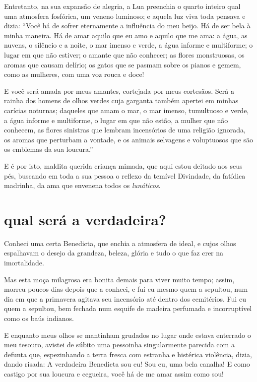 Entretanto, na sua expansão de alegria, a Lua preenchia o quarto inteiro 
qual uma atmosfera fosfórica, um veneno luminoso; e aquela 
luz viva toda pensava e dizia: “Você há de sofrer eternamente
a influência do meu beijo. Há de ser bela à minha maneira. Há de amar
aquilo que eu amo e aquilo que me ama: a água, as nuvens, o silêncio e
a noite, o mar imenso e verde, a água informe e multiforme; o lugar em
que não estiver; o amante que não conhecer; as flores monstruosas, os
aromas que causam delírio; os gatos que se pasmam sobre os pianos e
gemem, como as mulheres, com uma voz rouca e doce!

E você será amada por meus amantes, cortejada por meus
cortesãos. Será a rainha dos homens de olhos verdes cuja
garganta também apertei em minhas carícias noturnas; daqueles que amam
o mar, o mar imenso, tumultuoso e verde, a água informe e multiforme, o
lugar em que não estão, a mulher que não conhecem, as flores sinistras
que lembram incensórios de uma religião ignorada, os
aromas que perturbam a vontade, e os animais selvagens e voluptuosos
que são os emblemas da sua loucura.''

\quebra
E é por isto, maldita querida criança mimada, que aqui estou deitado
aos seus pés, buscando em toda a sua pessoa o reflexo da temível
Divindade, da fatídica madrinha, da ama que envenena todos os
\textit{lunáticos}.

\quebra\section[Qual será a verdadeira?]{qual será a verdadeira?}

Conheci uma certa Benedicta, que enchia a atmosfera de ideal, e cujos
olhos espalhavam o desejo da grandeza, beleza, glória e tudo o
que faz crer na imortalidade.

Mas esta moça milagrosa era bonita demais para viver muito tempo;
assim, morreu poucos dias depois que a conheci, e fui eu
mesmo quem a sepultou, num dia em que a primavera agitava seu
incensório até dentro dos cemitérios. Fui eu quem a sepultou, bem
fechada num esquife de madeira perfumada e incorruptível como os baús
indianos.

E enquanto meus olhos se mantinham grudados no lugar onde estava enterrado
o meu tesouro, avistei de súbito uma pessoinha singularmente parecida com a defunta que, espezinhando a terra fresca com 
estranha e histérica violência, dizia, dando risada:
A verdadeira Benedicta sou eu! Sou eu, uma bela
canalha! E como castigo por sua loucura e cegueira, você há de me amar assim
como sou!

